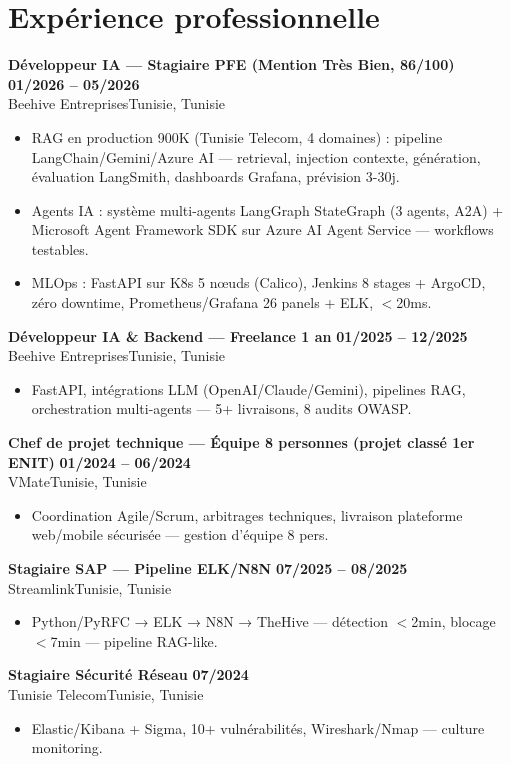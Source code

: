 \documentclass[a4paper,10pt]{article}
\newcommand{\cventry}[4]{\textbf{#1} \hfill \textbf{#4}\\[1pt]#2{\ifx\relax#3\relax\else, #3\fi}\par\vspace{2pt}}
\begin{document}
\section{Expérience professionnelle}
\cventry{Développeur IA — Stagiaire PFE (Mention Très Bien, 86/100)}{Beehive Entreprises}{Tunisie}{01/2026 -- 05/2026}
\begin{itemize}
  \item RAG en production 900K (Tunisie Telecom, 4 domaines) : pipeline LangChain/Gemini/Azure AI — retrieval, injection contexte, génération, évaluation LangSmith, dashboards Grafana, prévision 3-30j.
  \item Agents IA : système multi-agents LangGraph StateGraph (3 agents, A2A) + Microsoft Agent Framework SDK sur Azure AI Agent Service — workflows testables.
  \item MLOps : FastAPI sur K8s 5 nœuds (Calico), Jenkins 8 stages + ArgoCD, zéro downtime, Prometheus/Grafana 26 panels + ELK, $<$20ms.
\end{itemize}
\cventry{Développeur IA \& Backend — Freelance 1 an}{Beehive Entreprises}{Tunisie}{01/2025 -- 12/2025}
\begin{itemize}
  \item FastAPI, intégrations LLM (OpenAI/Claude/Gemini), pipelines RAG, orchestration multi-agents — 5+ livraisons, 8 audits OWASP.
\end{itemize}
\cventry{Chef de projet technique — Équipe 8 personnes (projet classé 1er ENIT)}{VMate}{Tunisie}{01/2024 -- 06/2024}
\begin{itemize}
  \item Coordination Agile/Scrum, arbitrages techniques, livraison plateforme web/mobile sécurisée — gestion d'équipe 8 pers.
\end{itemize}
\cventry{Stagiaire SAP — Pipeline ELK/N8N}{Streamlink}{Tunisie}{07/2025 -- 08/2025}
\begin{itemize}
  \item Python/PyRFC → ELK → N8N → TheHive — détection $<$2min, blocage $<$7min — pipeline RAG-like.
\end{itemize}
\cventry{Stagiaire Sécurité Réseau}{Tunisie Telecom}{Tunisie}{07/2024}
\begin{itemize}
  \item Elastic/Kibana + Sigma, 10+ vulnérabilités, Wireshark/Nmap — culture monitoring.
\end{itemize}
\end{document}

